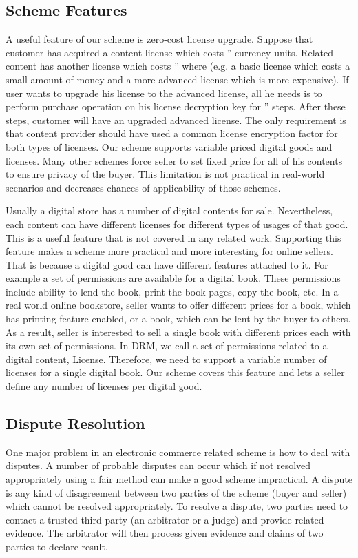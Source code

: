 \documentclass[times]{secauth}
\begin{document}
\subsection{Scheme Features}
\label{sec:useful_features}
A useful feature of our scheme is zero-cost license upgrade. Suppose that customer has acquired a content license which costs '' currency units. Related content has another license which costs '' where  (e.g. a basic license which costs a small amount of money and a more advanced license which is more expensive). If user wants to upgrade his license to the advanced license, all he needs is to perform purchase operation on his license decryption key for '' steps. After these steps, customer will have an upgraded advanced license. The only requirement is that content provider should have used a common license encryption factor  for both types of licenses.
Our scheme supports variable priced digital goods and licenses. Many other schemes force seller to set fixed price for all of his contents to ensure privacy of the buyer. This limitation is not practical in real-world scenarios and decreases chances of applicability of those schemes.

Usually a digital store has a number of digital contents for sale. Nevertheless, each content  can have different licenses for different types of usages of that good. This is a useful feature that is not covered in any related work. Supporting this feature makes a scheme more practical and more interesting for online sellers. That is because a digital good can have different features attached to it. For example a set of permissions are available for a digital book. These permissions include ability to lend the book, print the book pages, copy the book, etc. In a real world online bookstore, seller wants to offer different prices for a book, which has printing feature enabled, or a book, which can be lent by the buyer to others. As a result, seller is interested to sell a single book with different prices each with its own set of permissions. In DRM, we call a set of permissions related to a digital content, License. Therefore, we need to support a variable number of licenses for a single digital book. Our scheme covers this feature and lets a seller define any number of licenses per digital good.

\subsection{Dispute Resolution}
\label{sec:dispute}
One major problem in an electronic commerce related scheme is how to deal with disputes. A number of probable disputes can occur which if not resolved appropriately using a fair method can make a good scheme impractical. A dispute is any kind of disagreement between two parties of the scheme (buyer and seller) which cannot be resolved appropriately. To resolve a dispute, two parties need to contact a trusted third party (an arbitrator or a judge) and provide related evidence. The arbitrator will then process given evidence and claims of two parties to declare result. 
\end{document}

